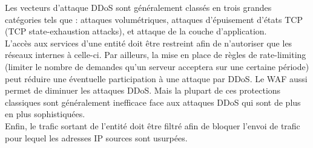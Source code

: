 	Les vecteurs d’attaque DDoS sont généralement classés en trois grandes catégories tels que : attaques volumétriques, attaques d’épuisement d’états TCP (TCP state-exhaustion attacks), et attaque de la couche d’application.\\

	L’accès aux services d’une entité doit être restreint afin de n’autoriser que les réseaux internes à celle-ci. Par ailleurs, la mise en place de règles de rate-limiting (limiter le nombre de demandes qu'un serveur acceptera sur une certaine période) peut réduire une éventuelle participation à une attaque par DDoS. Le WAF aussi permet de diminuer les attaques DDoS. Mais la plupart de ces protections classiques sont généralement inefficace face aux attaques DDoS qui sont de plus en plus sophistiquées.\\
	
	Enfin, le trafic sortant de l’entité doit être filtré afin de bloquer l’envoi de trafic pour lequel les adresses IP sources sont usurpées.

